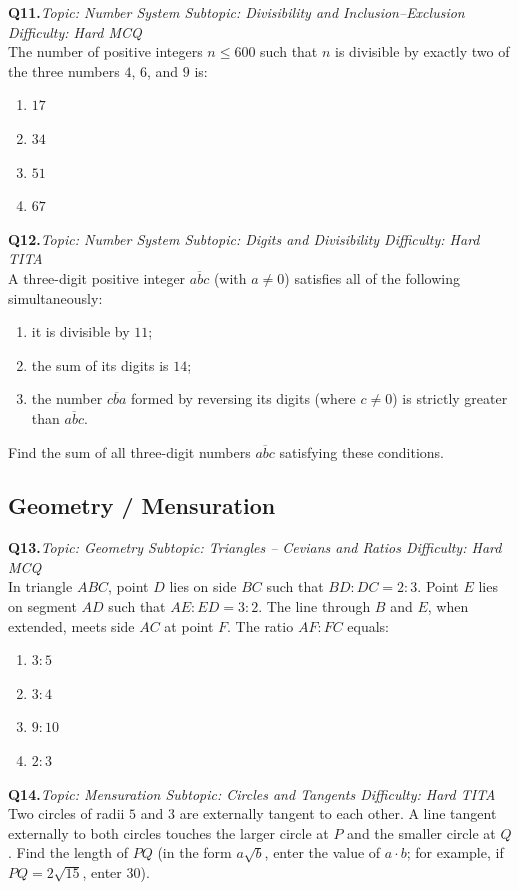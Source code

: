 \documentclass[11pt,a4paper]{article}
\newcommand{\qhead}[4]{%
  \vspace{0.7em}\noindent\textbf{Q#1.}\hfill\textit{Topic: #2 \textbar{} Subtopic: #3 \textbar{} Difficulty: #4}\\[-0.2em]
}
\begin{document}
\qhead{11}{Number System}{Divisibility and Inclusion--Exclusion}{Hard \textbar{} MCQ}
The number of positive integers $n \le 600$ such that $n$ is divisible by exactly two of the three numbers $4$, $6$, and $9$ is:
\begin{enumerate}[label=(\Alph*),leftmargin=*]
  \item $17$
  \item $34$
  \item $51$
  \item $67$
\end{enumerate}

\qhead{12}{Number System}{Digits and Divisibility}{Hard \textbar{} TITA}
A three-digit positive integer $\overline{abc}$ (with $a \neq 0$) satisfies all of the following simultaneously:
\begin{enumerate}[label=(\roman*),leftmargin=*,itemsep=0pt]
  \item it is divisible by $11$;
  \item the sum of its digits is $14$;
  \item the number $\overline{cba}$ formed by reversing its digits (where $c\neq 0$) is strictly greater than $\overline{abc}$.
\end{enumerate}
Find the sum of all three-digit numbers $\overline{abc}$ satisfying these conditions.

\subsection*{Geometry / Mensuration}

\qhead{13}{Geometry}{Triangles -- Cevians and Ratios}{Hard \textbar{} MCQ}
In triangle $ABC$, point $D$ lies on side $BC$ such that $BD:DC=2:3$. Point $E$ lies on segment $AD$ such that $AE:ED=3:2$. The line through $B$ and $E$, when extended, meets side $AC$ at point $F$. The ratio $AF:FC$ equals:
\begin{enumerate}[label=(\Alph*),leftmargin=*]
  \item $3:5$
  \item $3:4$
  \item $9:10$
  \item $2:3$
\end{enumerate}

\qhead{14}{Mensuration}{Circles and Tangents}{Hard \textbar{} TITA}
Two circles of radii $5$ and $3$ are externally tangent to each other. A line tangent externally to both circles touches the larger circle at $P$ and the smaller circle at $Q$. Find the length of $PQ$ (in the form $a\sqrt{b}$, enter the value of $a\cdot b$; for example, if $PQ=2\sqrt{15}$, enter $30$).
\end{document}

